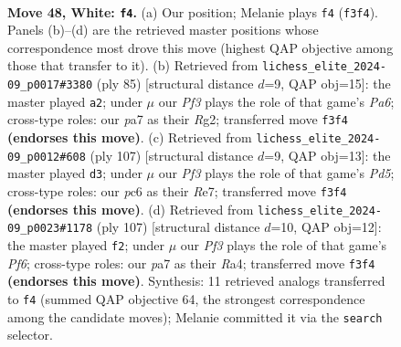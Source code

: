 \documentclass[11pt]{article}
\begin{document}
\clearpage

\begin{figure}[p]\centering
\begin{subfigure}{0.46\textwidth}\centering
\resizebox{\linewidth}{!}{%
\newchessgame
\chessboard[
  setfen={8/p2p4/2p5/4K3/7k/3r1P2/8/8 w - - 0 48},
  showmover=false,
  pgfstyle=straightmove, color=movearrow, markmove={f3-f4}
]}
\caption{}
\end{subfigure}\hfill
\begin{subfigure}{0.46\textwidth}\centering
\resizebox{\linewidth}{!}{%
\newchessgame
\chessboard[
  setfen={8/4k3/R5P1/4K3/8/p1P5/6r1/8 b - - 0 43},
  showmover=false,
  pgfstyle=straightmove, color=movearrow, markmove={a3-a2}
]}
\caption{}
\end{subfigure}
\\[4pt]
\begin{subfigure}{0.46\textwidth}\centering
\resizebox{\linewidth}{!}{%
\newchessgame
\chessboard[
  setfen={8/4r3/1k6/8/P1Rp4/5K2/8/8 b - - 1 54},
  showmover=false,
  pgfstyle=straightmove, color=movearrow, markmove={d4-d3}
]}
\caption{}
\end{subfigure}\hfill
\begin{subfigure}{0.46\textwidth}\centering
\resizebox{\linewidth}{!}{%
\newchessgame
\chessboard[
  setfen={8/6k1/3K4/P4R1P/r7/5p2/8/8 b - - 2 54},
  showmover=false,
  pgfstyle=straightmove, color=movearrow, markmove={f3-f2}
]}
\caption{}
\end{subfigure}
\caption{\textbf{Move 48, White: \texttt{f4}.} (a) Our position; Melanie plays \texttt{f4} (\texttt{f3f4}). Panels (b)--(d) are the retrieved master positions whose correspondence most drove this move (highest QAP objective among those that transfer to it). (b) Retrieved from \texttt{lichess\_elite\_2024-09\_p0017\#3380} (ply 85) [structural distance $d$=9, QAP obj=15]: the master played \texttt{a2}; under $\mu$ our \emph{Pf3} plays the role of that game's \emph{Pa6}; cross-type roles: our \emph{p}a7 as their \emph{R}g2; transferred move \texttt{f3f4} \textbf{(endorses this move)}. (c) Retrieved from \texttt{lichess\_elite\_2024-09\_p0012\#608} (ply 107) [structural distance $d$=9, QAP obj=13]: the master played \texttt{d3}; under $\mu$ our \emph{Pf3} plays the role of that game's \emph{Pd5}; cross-type roles: our \emph{p}c6 as their \emph{R}e7; transferred move \texttt{f3f4} \textbf{(endorses this move)}. (d) Retrieved from \texttt{lichess\_elite\_2024-09\_p0023\#1178} (ply 107) [structural distance $d$=10, QAP obj=12]: the master played \texttt{f2}; under $\mu$ our \emph{Pf3} plays the role of that game's \emph{Pf6}; cross-type roles: our \emph{p}a7 as their \emph{R}a4; transferred move \texttt{f3f4} \textbf{(endorses this move)}. Synthesis: 11 retrieved analogs transferred to \texttt{f4} (summed QAP objective 64, the strongest correspondence among the candidate moves); Melanie committed it via the \texttt{search} selector.}
\label{fig:thought-m94}
\end{figure}
\end{document}
